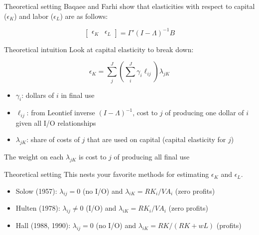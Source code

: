 \documentclass[10pt,xcolor=dvipsnames]{beamer}
\begin{document}
\begin{frame}{Theoretical setting}
Baqaee and Farhi show that elasticities with respect to capital ($\epsilon_K$) and labor ($\epsilon_L$) are as follows:

\begin{equation}
  \begin{bmatrix}
    \epsilon_K &
    \epsilon_L
  \end{bmatrix}
  =
  \Gamma' (I - \Lambda)^{-1} B
\end{equation}

\end{frame}

\begin{frame}{Theoretical intuition}
Look at capital elasticity to break down:

\begin{equation}
  \epsilon_K = \sum_{j}^{J} \left(\sum_{i}^{J} \gamma_i \ell_{ij} \right) \lambda_{jK}
\end{equation}

\begin{itemize}
  \item $\gamma_i $: dollars of $i$ in final use
  \item $\ell_{ij}$: from Leontief inverse $(I - \Lambda)^{-1}$, cost to $j$ of producing one dollar of $i$ given all I/O relationships
  \item $\lambda_{jK}$: share of costs of $j$ that are used on capital (capital elasticity for $j$)  
\end{itemize}

\vspace{.25in}

The weight on each $\lambda_{jK}$ is cost to $j$ of producing all final use

\end{frame}

\begin{frame}{Theoretical setting}
This nests your favorite methods for estimating $\epsilon_K$ and $\epsilon_L$.
\vspace{.25in}

\begin{itemize}
  \item Solow (1957): $\lambda_{ij} = 0$ (no I/O) and $\lambda_{iK} = RK_i/VA_i$ (zero profits)
  \item Hulten (1978): $\lambda_{ij} \neq 0$ (I/O) and $\lambda_{iK} = RK_i/VA_i$ (zero profits)
  \item Hall (1988, 1990): $\lambda_{ij} = 0$ (no I/O) and $\lambda_{iK} = RK/(RK+wL)$ (profits)
\end{itemize}

\end{frame}
\end{document}
